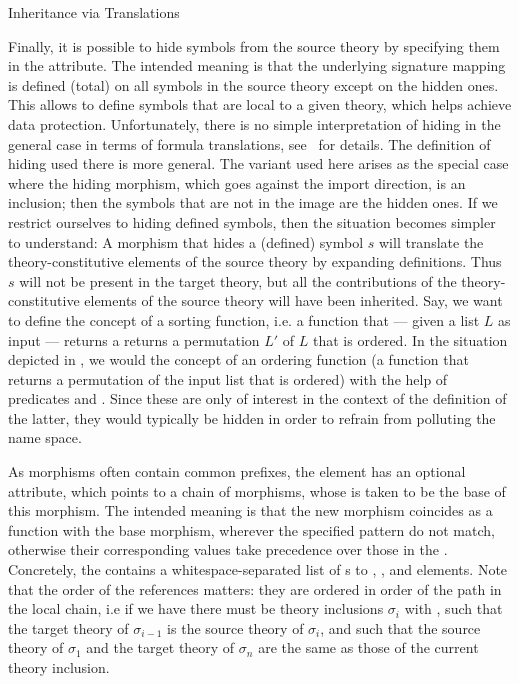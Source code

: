 \begin{omgroup}[id=complex-theories,short=Complex Theories,
                            creators=miko,contributors=frabe]
\begin{omgroup}[id=morphisms]{Inheritance via Translations}
\begin{module}[id=morphisms]
Finally, it is possible to hide symbols from the source theory by specifying them in the
{} attribute. The intended meaning is that the underlying
signature mapping is defined (total) on all symbols in the source theory except on the
hidden ones. This allows to define symbols that are local to a given theory, which helps
achieve data protection. Unfortunately, there is no simple interpretation of hiding in the
general case in terms of formula translations, see~\cite{CoFI:2004:CASL-RM,MAH-06-a} for
details. The definition of hiding used there is more general. The variant used here arises
as the special case where the hiding morphism, which goes against the import direction, is
an inclusion; then the symbols that are not in the image are the hidden ones.  If we
restrict ourselves to hiding defined symbols, then the situation becomes simpler to
understand: A morphism that hides a (defined) symbol $s$ will translate the
theory-constitutive elements of the source theory by expanding definitions. Thus $s$ will
not be present in the target theory, but all the contributions of the theory-constitutive
elements of the source theory will have been inherited. Say, we want to define the concept
of a sorting function, i.e. a function that --- given a list $L$ as input --- returns a
returns a permutation $L'$ of $L$ that is ordered. In the situation depicted in
{}, we would the concept of an ordering function (a function
that returns a permutation of the input list that is ordered) with the help of predicates
{} and {}. Since these are only of interest in the context
of the definition of the latter, they would typically be hidden in order to refrain from
polluting the name space.

As morphisms often contain common prefixes, the {} element has an
optional {} attribute, which points to a chain of morphisms,
whose {} is taken to be the base of this morphism. The intended
meaning is that the new morphism coincides as a function with the base morphism, wherever
the specified pattern do not match, otherwise their corresponding values take precedence
over those in the {}.  Concretely, the
{} contains a whitespace-separated list of
{s} to {}, {},
and {} elements. Note that the order of the references matters: they are
ordered in order of the path in the local chain, i.e if we have
{} there must be theory inclusions
$\sigma_i$ with {}, such that the target theory
of $\sigma_{i-1}$ is the source theory of $\sigma_i$, and such that the source theory of
$\sigma_1$ and the target theory of $\sigma_n$ are the same as those of the current theory
inclusion.


\end{module}
\end{omgroup}
\end{omgroup}
